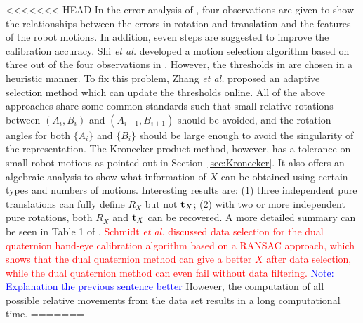 \documentclass[twocolumn,10pt]{asme2ej}
\newcommand{\ttt}{{\bf t}}
\begin{document}
<<<<<<< HEAD
In the error analysis of \cite{tsai1989new}, four observations are given to show the relationships between the errors in rotation and translation and the features of the robot motions. In addition, seven steps are suggested to improve the calibration accuracy. Shi {\it{et al.}} \cite{shi2005approach} developed a motion selection algorithm based on three out of the four observations in \cite{tsai1989new}. However, the thresholds in \cite{shi2005approach} are chosen in a heuristic manner. To fix this problem,  Zhang {\it{et al.}} \cite{zhang2005adaptive} proposed an adaptive selection method which can update the thresholds online. All of the above approaches share some common standards such that small relative rotations between $(A_i, B_i)$ and $(A_{i+1}, B_{i+1})$ should be avoided, and the rotation angles for both $\{A_i\}$ and $\{B_i\}$ should be large enough to avoid the singularity of the representation. The Kronecker product method, however, has a tolerance on small robot motions as pointed out in Section~\ref{sec:Kronecker}. It also offers an algebraic analysis to show what information of $X$ can be obtained using certain types and numbers of motions. Interesting results are: (1) three independent pure translations can fully define $R_X$ but not $\ttt_{X}$; (2) with two or more independent pure rotations, both $R_{X}$ and $\ttt_{X}$ can be recovered. A more detailed summary can be seen in Table 1 of \cite{andreff1999line}. \textcolor{red}{Schmidt {\it{et al.}} \cite{schmidt2003robust} discussed data selection for the dual quaternion hand-eye calibration algorithm based on a RANSAC approach, which shows that the dual quaternion method can give a better $X$ after data selection, while the dual quaternion method can even fail without data filtering.} \textcolor{blue}{Note: Explanation the previous sentence better} However, the computation of all possible relative movements from the data set results in a long computational time. 
=======
\end{document}
